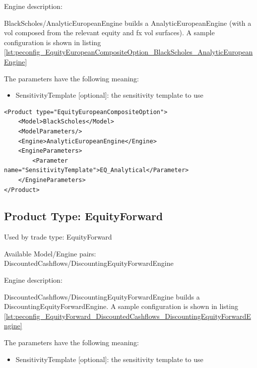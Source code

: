 Engine description:

BlackScholes/AnalyticEuropeanEngine builds a AnalyticEuropeanEngine (with a vol composed from the relevant equity and fx
vol surfaces). A sample configuration is shown in listing
\ref{lst:peconfig_EquityEuropeanCompositeOption_BlackScholes_AnalyticEuropeanEngine}

The parameters have the following meaning:

\begin{itemize}
\item SensitivityTemplate [optional]: the sensitivity template to use
\end{itemize}

\begin{longlisting}
\begin{verbatim}
<Product type="EquityEuropeanCompositeOption">
    <Model>BlackScholes</Model>
    <ModelParameters/>
    <Engine>AnalyticEuropeanEngine</Engine>
    <EngineParameters>
        <Parameter name="SensitivityTemplate">EQ_Analytical</Parameter>
    </EngineParameters>
</Product>
\end{verbatim}
\caption{Configuration for Product EquityEuropeanCompositeOption, Model BlackScholes, Engine AnalyticEuropeanEngine}
\label{lst:peconfig_EquityEuropeanCompositeOption_BlackScholes_AnalyticEuropeanEngine}
\end{longlisting}

\subsection{Product Type: EquityForward}

Used by trade type: EquityForward

Available Model/Engine pairs: DiscountedCashflows/DiscountingEquityForwardEngine

Engine description:

DiscountedCashflows/DiscountingEquityForwardEngine builds a DiscountingEquityForwardEngine. A sample configuration is
shown in listing \ref{lst:peconfig_EquityForward_DiscountedCashflows_DiscountingEquityForwardEngine}

The parameters have the following meaning:

\begin{itemize}
\item SensitivityTemplate [optional]: the sensitivity template to use
\end{itemize}

